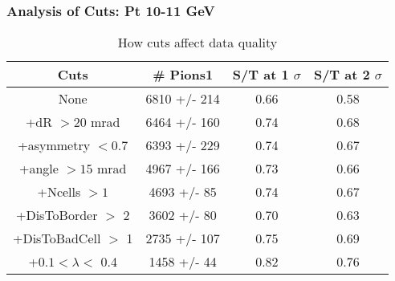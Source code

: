 \frame
{
\frametitle{Analysis of Cuts: Pt 10-11 GeV}
\begin{table}
\caption{How cuts affect data quality}
\centering
\begin{tabular}{c c c c}
\hline\hline
Cuts & \# Pions1 & S/T at 1 $\sigma$ & S/T at 2 $\sigma$ \\ [0.5ex]
\hline
None & 6810 +/-  214 & 0.66 & 0.58 \\ %
+dR $> 20$ mrad & 6464 +/-  160 & 0.74 & 0.68 \\ %
+asymmetry $< 0.7$ & 6393 +/-  229 & 0.74 & 0.67 \\ %
+angle $> 15$ mrad & 4967 +/-  166 & 0.73 & 0.66 \\ %
+Ncells $> 1$& 4693 +/-   85 & 0.74 & 0.67 \\ %
+DisToBorder $>$ 2 & 3602 +/-   80 & 0.70 & 0.63 \\ %
+DisToBadCell $>$ 1& 2735 +/-  107 & 0.75 & 0.69 \\ %
+$0.1 < \lambda <$ 0.4 & 1458 +/-   44 & 0.82 & 0.76 \\ %
[1ex]
\hline
\end{tabular}
\label{table:nonlin}
\end{table}
}
